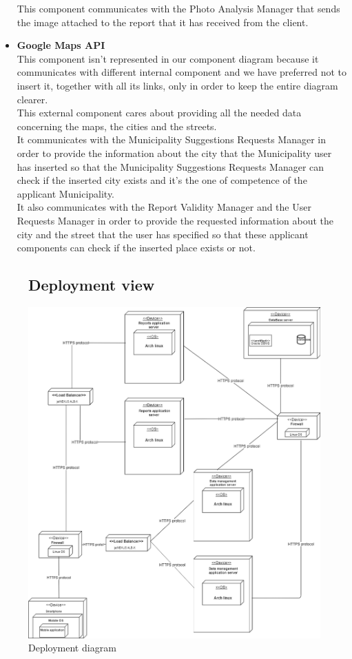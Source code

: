 \documentclass[titlepage]{article}
\begin{document}
\begin{itemize}
This component communicates with the Photo Analysis Manager that sends the image attached to the report that it has received from the client. 
\item \textbf{Google Maps API}\\
This component isn't represented in our component diagram because it communicates with different internal component and we have preferred not to insert it, together with all its links, only in order to keep the entire diagram clearer. \\
This external component cares about providing all the needed data concerning the maps, the cities and the streets. \\
It communicates with the Municipality Suggestions Requests Manager in order to provide the information about the city that the Municipality user has inserted so that the Municipality Suggestions Requests Manager can check if the inserted city exists and it's the one of competence of the applicant Municipality. \\
It also communicates with the Report Validity Manager and the User Requests Manager in order to provide the requested information about the city and the street that the user has specified so that these applicant components can check if the inserted place exists or not.
\end{itemize}




\begin{figure}[h]
	\subsection{Deployment view}
	\includegraphics[scale=0.465]{Diagrams/Deployment diagram.png}
	\caption{Deployment diagram}
\end{figure}
\FloatBarrier
\end{document}
